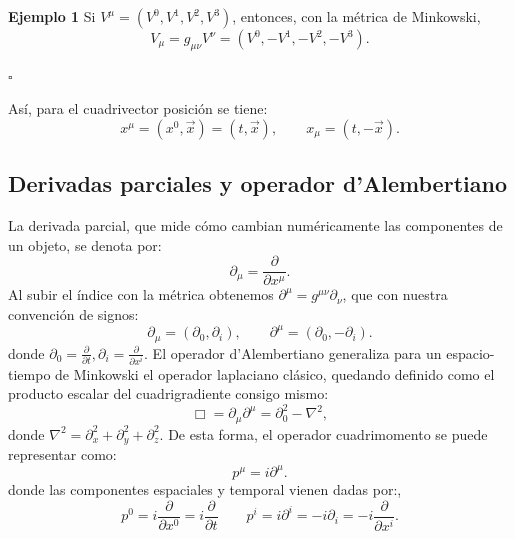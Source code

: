 \documentclass[a4paper,11pt]{book} %
\begin{document}
\noindent
\textbf{Ejemplo 1} 
\medskip\newline\noindent
Si $V^\mu = (V^0,V^1,V^2,V^3)$,
entonces, con la métrica de Minkowski,
\begin{equation}
    V_\mu
    =
    g_{\mu\nu}V^\nu
    =
    (V^0,-V^1,-V^2,-V^3).
\end{equation}
\begin{flushright}
    \(\square\)
\end{flushright}
Así, para el cuadrivector posición se tiene:
\begin{equation}
    x^\mu = (x^0,\vec{x}) = (t,\vec{x}),
    \qquad
    x_\mu = (t,-\vec{x}).
\end{equation}
\subsection{Derivadas parciales y operador d'Alembertiano}
\noindent
La derivada parcial, que mide cómo cambian numéricamente las componentes de un objeto, se denota por:
\begin{equation}
    \partial_\mu = \frac{\partial}{\partial x^\mu}.
\end{equation}
Al subir el índice con la métrica obtenemos $\partial^\mu = g^{\mu\nu}\partial_\nu$, que con nuestra convención de signos:
\begin{equation}
    \partial_\mu = (\partial_0,\partial_i),
    \qquad
    \partial^\mu = (\partial_0,-\partial_i).
\end{equation}
\noindent donde $\partial_0 = \frac{\partial}{\partial t},
    \partial_i = \frac{\partial}{\partial x^i}$.
\medskip\newline\noindent
El operador d'Alembertiano generaliza para un espacio-tiempo de Minkowski el operador laplaciano clásico, quedando definido como el producto escalar del cuadrigradiente consigo mismo:
\begin{equation}
    \Box
    =
    \partial_\mu \partial^\mu
    =
    \partial_0^2 - \nabla^2,
\end{equation}
donde $\nabla^2
    =
    \partial_x^2 + \partial_y^2 + \partial_z^2$.
\medskip\newline
De esta forma, el operador cuadrimomento se puede representar como:
\begin{equation}
    p^\mu = i\partial^\mu.
\end{equation}
\noindent
donde las componentes espaciales y temporal vienen dadas por:,
\begin{equation}
    p^0 = i\frac{\partial}{\partial x^0}
        = i\frac{\partial}{\partial t}
\qquad
    p^i = i\partial^i = -i\partial_i
        = -i\frac{\partial}{\partial x^i}.
\end{equation}
\end{document}
